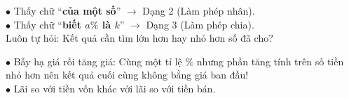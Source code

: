 \documentclass[14pt,a4paper,oneside]{extbook}
\begin{document}
\noindent
\begin{minipage}[t]{0.54\textwidth}
  \begin{tcolorbox}[
    enhanced,
    title={\footnotesize\bfseries\color{white}\faKey\ Bí kíp phân biệt Dạng 2 và Dạng 3},
    colback=green!3!white,
    colframe=green!60!black,
    arc=2.5mm, boxrule=0.8pt, top=1.8mm, bottom=1.8mm, left=2.2mm, right=2.2mm
  ]
    \footnotesize
    $\bullet$ Thấy chữ ``\textbf{của một số}'' $\rightarrow$ Dạng 2 (Làm phép nhân).\\
    $\bullet$ Thấy chữ ``\textbf{biết $a\%$ là $k$}'' $\rightarrow$ Dạng 3 (Làm phép chia).\\
    Luôn tự hỏi: Kết quả cần tìm lớn hơn hay nhỏ hơn số đã cho?
  \end{tcolorbox}
\end{minipage}%
\hfill
\begin{minipage}[t]{0.44\textwidth}
  \begin{tcolorbox}[
    enhanced,
    title={\footnotesize\bfseries\color{white}\faExclamationTriangle\ Mẹo tránh bẫy trắc nghiệm},
    colback=red!2!white,
    colframe=red!70!black,
    arc=2.5mm, boxrule=0.8pt, top=1.8mm, bottom=1.8mm, left=2.2mm, right=2.2mm
  ]
    \footnotesize
    $\bullet$ Bẫy hạ giá rồi tăng giá: Cùng một tỉ lệ $\%$ nhưng phần tăng tính trên số tiền nhỏ hơn nên kết quả cuối cùng không bằng giá ban đầu!\\
    $\bullet$ Lãi so với tiền vốn khác với lãi so với tiền bán.
  \end{tcolorbox}
\end{minipage}
\end{document}
